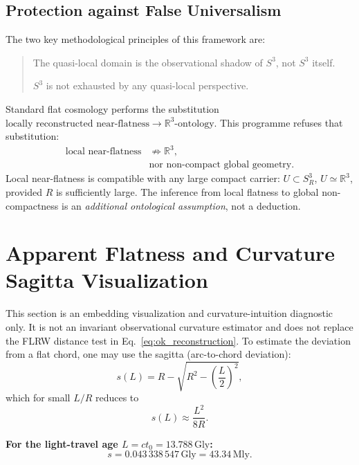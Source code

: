 \documentclass[aps,prd,onecolumn,superscriptaddress,longbibliography,nofootinbib,notitlepage]{revtex4-2}
\newcommand{\Gly}{\,\mathrm{Gly}}
\newcommand{\Mly}{\,\mathrm{Mly}}
\begin{document}
\subsection{Protection against False Universalism}

The two key methodological principles of this framework are:
\begin{quote}
The quasi-local domain is the observational shadow of $S^3$, not $S^3$ itself.

$S^3$ is not exhausted by any quasi-local perspective.
\end{quote}

Standard flat cosmology performs the substitution
$\text{locally reconstructed near-flatness} \to \mathbb{R}^3\text{-ontology}$.
This programme refuses that substitution:
\begin{equation}
\begin{aligned}
  \text{local near-flatness}
  &\not\Rightarrow \mathbb{R}^3, \\
  &\text{nor non-compact global geometry.}
\end{aligned}
\end{equation}
Local near-flatness is compatible with any large compact carrier:
$U \subset S^3_R$, $U \simeq \mathbb{R}^3$, provided $R$ is sufficiently large.
The inference from local flatness to global non-compactness is an \emph{additional
ontological assumption}, not a deduction.

\section{Apparent Flatness and Curvature Sagitta Visualization}
\label{sec:flatness}

This section is an embedding visualization and curvature-intuition diagnostic only. It
is not an invariant observational curvature estimator and does not replace the FLRW
distance test in Eq.~\eqref{eq:ok_reconstruction}. To estimate the deviation from a
flat chord, one may use the sagitta (arc-to-chord deviation):
\begin{equation}
  s(L)=R-\sqrt{R^2-\left(\frac{L}{2}\right)^2},
\end{equation}
which for small $L/R$ reduces to
\begin{equation}
  s(L) \approx \frac{L^2}{8R}.
\end{equation}

\textbf{For the light-travel age $L = ct_0 = 13.788\Gly$:}
\begin{equation}
  \boxed{s = 0.043\,338\,547\Gly = 43.34\Mly.}
\end{equation}
\end{document}
